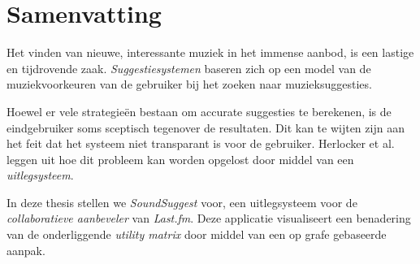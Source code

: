 \chapter*{Samenvatting}\label{chapter:summary:dutch}


Het vinden van nieuwe, interessante muziek in het immense aanbod, is een lastige en tijdrovende zaak. \emph{Suggestiesystemen} baseren zich op een model van de muziekvoorkeuren van de gebruiker bij het zoeken naar muzieksuggesties.



Hoewel er vele strategie\"en bestaan om accurate suggesties te berekenen, is de eindgebruiker soms sceptisch tegenover de resultaten. Dit kan te wijten zijn aan het feit dat het systeem niet transparant is voor de gebruiker. Herlocker et al. \cite{herlocker:2000} leggen uit hoe dit probleem kan worden opgelost door middel van een \emph{uitlegsysteem}.



In deze thesis stellen we \emph{SoundSuggest} voor, een uitlegsysteem voor de \emph{collaboratieve aanbeveler} van \emph{Last.fm}. Deze applicatie visualiseert een benadering van de onderliggende \emph{utility matrix} door middel van een op grafe gebaseerde aanpak.

